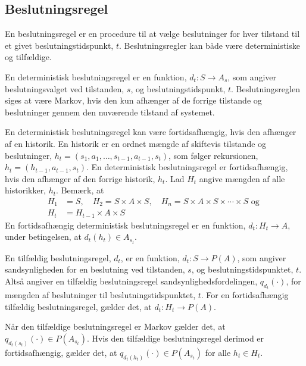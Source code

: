 


\subsection{Beslutningsregel}\label{afsnit:beslutningsregel}
En beslutningsregel er en procedure til at vælge beslutninger for hver tilstand til et givet beslutningstidspunkt, $t$. Beslutningsregler kan både være deterministiske og tilfældige.%

En deterministisk beslutningsregel er en funktion, $d_t:S\to A_s$, som angiver beslutningsvalget ved tilstanden, $s$, og beslutningstidspunkt, $t$. Beslutningsreglen siges at være Markov, hvis den kun afhænger af de forrige tilstande og beslutninger gennem den nuværende tilstand af systemet. 

En deterministisk beslutningsregel kan være fortidsafhængig, hvis den afhænger af en historik. En historik er en ordnet mængde af skiftevis tilstande og beslutninger, $h_t = (s_1, a_1, \dots,  s_{t-1}, a_{t-1}, s_t)$, som følger rekursionen, $h_t=(h_{t-1}, a_{t-1}, s_t)$. En deterministisk beslutningsregel er fortidsafhængig, hvis den afhænger af den forrige historik, $h_t$.
Lad $H_t$ angive mængden af alle historikker, $h_t$. Bemærk, at 
\begin{align*}
    H_1&=S, \quad H_2=S\times A\times S, \quad H_n =S\times A\times S\times \cdots \times S \text{ og }\\
    H_t&=H_{t-1}\times A\times S 
\end{align*}
En fortidsafhængig deterministisk beslutningsregel er en funktion, $d_t: H_t\to A$, under betingelsen, at $d_t(h_t)\in A_{s_t}$.

En tilfældig beslutningsregel, $d_t$, er en funktion, $d_t: S\to P(A)$, som angiver sandsynligheden for en beslutning ved tilstanden, $s$, og beslutningstidspunktet, $t$. Altså angiver en tilfældig beslutningsregel sandsynlighedsfordelingen, $q_{d_t}(\cdot)$, for mængden af beslutninger til beslutningstidspunktet, $t$. For en fortidsafhængig tilfældig beslutningsregel, gælder det, at $d_t:H_t\to P(A)$.

Når den tilfældige beslutningsregel er Markov gælder det, at $q_{d_t(s_t)}(\cdot)\in P(A_{s_t})$. Hvis den tilfældige beslutningsregel derimod er fortidsafhængig, gælder det, at $q_{d_t(h_t)}(\cdot)\in P(A_{s_t})$ for alle $h_t\in H_t$.

